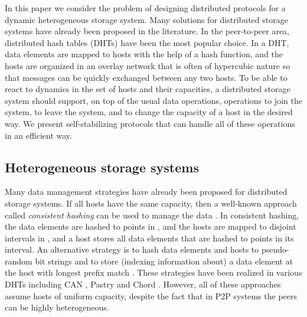 \documentclass[11pt]{article}
\begin{document}
In this paper we consider the problem of designing distributed protocols for a
dynamic heterogeneous storage system. Many solutions for distributed storage
systems have already been proposed in the literature. In the peer-to-peer
area, distributed hash tables (DHTs) have been the most popular choice. In a
DHT, data elements are mapped to hosts with the help of a hash function, and
the hosts are organized in an overlay network that is often of hypercubic
nature so that messages can be quickly exchanged between any two hosts. To be
able to react to dynamics in the set of hosts and their capacities, a
distributed storage system should support, on top of the usual data
operations, operations to join the system, to leave the system, and to change
the capacity of a host in the desired way. We present self-stabilizing
protocols that can handle all of these operations in an efficient way.


\subsection{Heterogeneous storage systems}

Many data management strategies have already been proposed for distributed
storage systems. If all hosts have the same capacity, then a well-known
approach called {\em consistent hashing} can be used to manage the data
\cite{conhash}. In consistent hashing, the data elements are hashed to points
in , and the hosts are mapped to disjoint intervals in , and a
host stores all data elements that are hashed to points in its interval. An
alternative strategy is to hash data elements and hosts to pseudo-random bit
strings and to store (indexing information about) a data element at the host
with longest prefix match \cite{Plaxton}. These strategies have been realized
in various DHTs including CAN \cite{RF+01:can}, Pastry \cite{RD01:pastry} and
Chord \cite{SM+01:chord}. However, all of these approaches assume hosts of
uniform capacity, despite the fact that in P2P systems the peers can be highly
heterogeneous.
\end{document}
